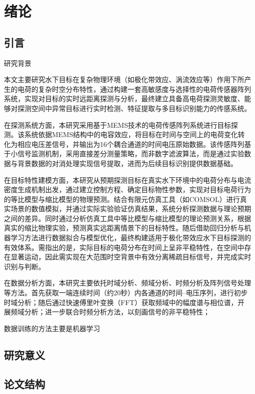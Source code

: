 \chapter{绪论}
\section{引言}
研究背景

本文主要研究水下目标在复杂物理环境（如极化带效应、涡流效应等）作用下所产生的电荷的复杂时空分布特性，通过构建一套高敏感度与选择性的电荷传感器阵列系统，实现对目标的实时远距离探测与分析，最终建立具备高电荷探测灵敏度、能够对探测空间中异常目标进行实时检测、特征提取与多目标识别能力的传感系统。

在探测系统方面，本研究采用基于MEMS技术的电荷传感阵列系统进行目标探测。该系统依据MEMS结构中的电容效应，将目标在时间与空间上的电荷变化转化为相应电压差信号，并输出为16个耦合通道的时间电压原始数据。该传感阵列基于小信号监测机制，采用直接差分测量策略，而非数字滤波算法，而是通过实验数据与背景数据的对消处理实现信号提取，进而为后续目标识别提供数据基础。

在目标特性建模方面，本研究从预期探测目标在真实水下环境中的电荷分布与电流密度生成机制出发，通过建立控制方程、确定目标物性参数，实现对目标电荷行为的等比模型与缩比模型的物理预测。结合有限元仿真工具（如COMSOL）进行真实场景的数值模拟，并通过实际实验验证仿真结果，系统分析探测数据与理论预期之间的差异。同时通过分析仿真工具中等比模型与缩比模型的理论预测关系，根据真实的缩比物理实验，预测真实远距离情景下的目标特性。随后借助回归分析与机器学习方法进行数据拟合与模型优化，最终构建适用于极化带效应水下目标探测的有效体系。需指出的是，实际目标的电荷分布在时间上呈非平稳特性，在空间中存在显著运动，因此需实现在大范围时空背景中有效分离稀疏目标信号，并完成实时识别与判断。

在数据分析方面，本研究主要依托时域分析、频域分析、时频分析及阵列信号处理等方法。首先获取一端连续时间（约20秒）内各通道的时间–电压序列，进行初步时域分析；随后通过快速傅里叶变换（FFT）获取频域中的幅度谱与相位谱，开展频域分析；进一步联合时频分析方法，以刻画信号的非平稳特性；

数据训练的方法主要是机器学习

\section{研究意义}
\section{论文结构}
